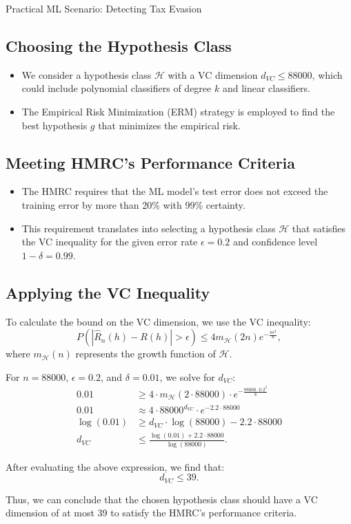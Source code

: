 \begin{examplebox}{Practical ML Scenario: Detecting Tax Evasion}
\subsection*{Choosing the Hypothesis Class}
\begin{itemize}
    \item We consider a hypothesis class $\mathcal{H}$ with a VC dimension $d_{VC} \leq 88000$, which could include polynomial classifiers of degree $k$ and linear classifiers.
    \item The Empirical Risk Minimization (ERM) strategy is employed to find the best hypothesis $g$ that minimizes the empirical risk.
\end{itemize}

\subsection*{Meeting HMRC's Performance Criteria}
\begin{itemize}
    \item The HMRC requires that the ML model's test error does not exceed the training error by more than 20\% with 99\% certainty.
    \item This requirement translates into selecting a hypothesis class $\mathcal{H}$ that satisfies the VC inequality for the given error rate $\epsilon = 0.2$ and confidence level $1 - \delta = 0.99$.
\end{itemize}

\subsection*{Applying the VC Inequality}
To calculate the bound on the VC dimension, we use the VC inequality:
\begin{equation*}
    P\left( |\widehat{R}_n(h) - R(h)| > \epsilon \right) \leq 4m_{\mathcal{H}}(2n)e^{-\frac{n\epsilon^2}{8}},
\end{equation*}
where $m_{\mathcal{H}}(n)$ represents the growth function of $\mathcal{H}$.

For $n = 88000$, $\epsilon = 0.2$, and $\delta = 0.01$, we solve for $d_{VC}$:
\begin{align*}
    0.01 & \geq 4 \cdot m_{\mathcal{H}}(2 \cdot 88000) \cdot e^{-\frac{88000 \cdot 0.2^2}{8}} \\
    0.01 & \approx 4 \cdot 88000^{d_{VC}} \cdot e^{-2.2 \cdot 88000} \\
    \log(0.01) & \geq d_{VC} \cdot \log(88000) - 2.2 \cdot 88000 \\
    d_{VC} & \leq \frac{\log(0.01) + 2.2 \cdot 88000}{\log(88000)}.
\end{align*}

After evaluating the above expression, we find that:
\begin{equation*}
    d_{VC} \leq 39.
\end{equation*}

Thus, we can conclude that the chosen hypothesis class should have a VC dimension of at most 39 to satisfy the HMRC's performance criteria.


\end{examplebox}

